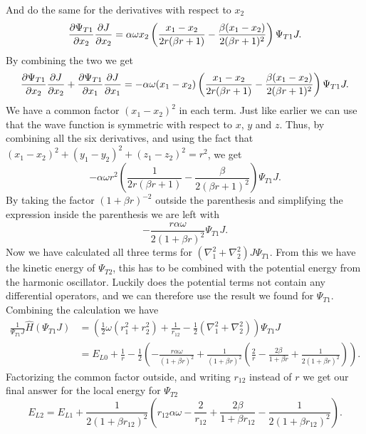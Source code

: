 \documentclass[%
 reprint,
nofootinbib,
aps,
]{revtex4-1}
\begin{document}
And do the same for the derivatives with respect to $x_2$
\begin{equation}
  \pdv{\Psi_{T1}}{x_2}\pdv{J}{x_2} = \alpha\omega x_2 \left( \frac{x_1-x_2}{2r(\beta r + 1)} - \frac{\beta(x_1-x_2)}{2(\beta r + 1)^2}\right) \Psi_{T1} J.
\end{equation}
By combining the two we get
\begin{equation}
  \pdv{\Psi_{T1}}{x_2}\pdv{J}{x_2} + \pdv{\Psi_{T1}}{x_1}\pdv{J}{x_1} = - \alpha\omega (x_1-x_2) \left( \frac{x_1-x_2}{2r(\beta r + 1)} - \frac{\beta(x_1-x_2)}{2(\beta r + 1)^2}\right) \Psi_{T1} J.
\end{equation}
We have a common factor $(x_1-x_2)^2$ in each term. Just like earlier we can use that the wave function is symmetric with respect to $x$, $y$ and $z$. Thus, by combining all the six derivatives, and using the fact that $(x_1-x_2)^2+(y_1-y_2)^2+(z_1-z_2)^2=r^2$, we get
\begin{equation}
  - \alpha\omega r^2 \left( \frac{1}{2r(\beta r + 1)} - \frac{\beta}{2(\beta r + 1)^2}\right) \Psi_{T1} J.
\end{equation}
By taking the factor $(1+\beta r)^{-2}$ outside the parenthesis and simplifying the expression inside the parenthesis we are left with
\begin{equation}
 -\frac{r\alpha\omega}{2(1+\beta r)^2}\Psi_{T1}J.
\end{equation}
Now we have calculated all three terms for $(\nabla_1^2 + \nabla_2^2)J\Psi_{T1}$. From this we have the kinetic energy of $\Psi_{T2}$, this has to be combined with the potential energy from the harmonic oscillator. Luckily does the potential terms not contain any differential operators, and we can therefore use the result we found for $\Psi_{T1}$. Combining the calculation we have
\begin{align}
  \frac{1}{\Psi_{T1}J}\hat{H}\left(\Psi_{T1}J\right) &= \left(\frac{1}{2}\omega \left(r_1^2+r_2^2\right)+\frac{1}{r_{12}} -\frac{1}{2}\left( \nabla_1^2 + \nabla_2^2 \right)\right) \Psi_{T1}J \\
  &= E_{L0} +\frac{1}{r} -\frac{1}{2}\left(-\frac{r\alpha\omega}{(1+\beta r)^2} + \frac{1}{(1+\beta r)^2}\left(\frac{2}{r} - \frac{2\beta}{1+\beta r} + \frac{1}{2(1+\beta r)^2}  \right)\right).
\end{align}
Factorizing the common factor outside, and writing $r_{12}$ instead of $r$ we get our final answer for the local energy for $\Psi_{T2}$
\begin{equation}
  E_{L2} = E_{L1} + \frac{1}{2(1+\beta r_{12})^2}\left(r_{12}\alpha\omega - \frac{2}{r_{12}} + \frac{2\beta}{1+\beta r_{12}} - \frac{1}{2(1+\beta r_{12})^2} \right).
\end{equation}
\end{document}
